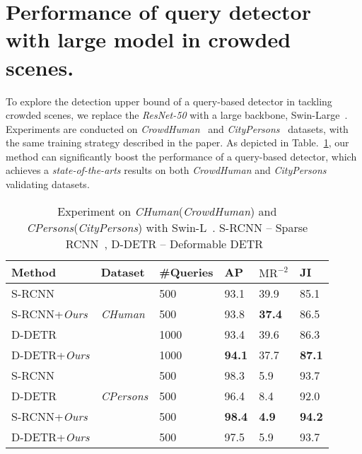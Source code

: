 \documentclass[final]{cvpr}
\begin{document}
\vspace{-0.1cm}
\section{Performance of query detector with large model in crowded scenes.}

To explore the detection upper bound of a query-based detector in tackling crowded scenes, we replace the \emph{ResNet-50} with a large backbone, Swin-Large~\cite{liu2021swin}. Experiments are conducted on \emph{CrowdHuman}~\cite{shao2018crowdhuman} and \emph{CityPersons}~\cite{zhang2017citypersons} datasets, with the same training strategy described in the paper. As depicted in Table.~\ref{tbl:large_model}, our method can significantly boost the performance of a query-based detector, which achieves a \textit{state-of-the-arts} results on both \emph{CrowdHuman} and \emph{CityPersons}  validating datasets.

\vspace{-0.2cm}
\begin{table}[ht]
	\centering
	\begin{tabular}{p{22mm}|p{12mm}<{\centering}|p{11mm}<{\centering}|p{4mm}<{\centering}p{5mm}<{\centering}p{4mm}<{\centering}}
		\toprule
		 Method& Dataset & \#Queries & AP & $\text{MR}^{-2}$  & JI \\
		\hline
		 S-RCNN&  & 500 & 93.1 & 39.9 & 85.1 \\
		 S-RCNN+\emph{Ours} &\emph{CHuman} & 500 &  93.8 & \textbf{37.4} & 86.5 \\
		D-DETR & & 1000& 93.4 & 39.6 & 86.3 \\
		D-DETR+\emph{Ours} & & 1000& \textbf{94.1} & 37.7 & \textbf{87.1} \\
		\hline
		S-RCNN&  & 500 & 98.3 & 5.9 & 93.7 \\
		 D-DETR &\emph{CPersons} & 500 &  96.4 & 8.4 & 92.0 \\
		S-RCNN+\emph{Ours} & & 500& \textbf{98.4} & \textbf{4.9} & \textbf{94.2} \\
		D-DETR+\emph{Ours} & & 500& 97.5 & 5.9 & 93.7 \\
		
		\bottomrule
	\end{tabular}
	\caption{Experiment on \emph{CHuman}(\emph{CrowdHuman}) and \emph{CPersons}(\emph{CityPersons}) with Swin-L~\cite{liu2021swin}. S-RCNN -- Sparse RCNN~\cite{sun2020sparse}, D-DETR -- Deformable DETR~\cite{zhu2021deformable}}
	\label{tbl:large_model}
	\vspace{-2pc}
\end{table}
\clearpage
\end{document}
